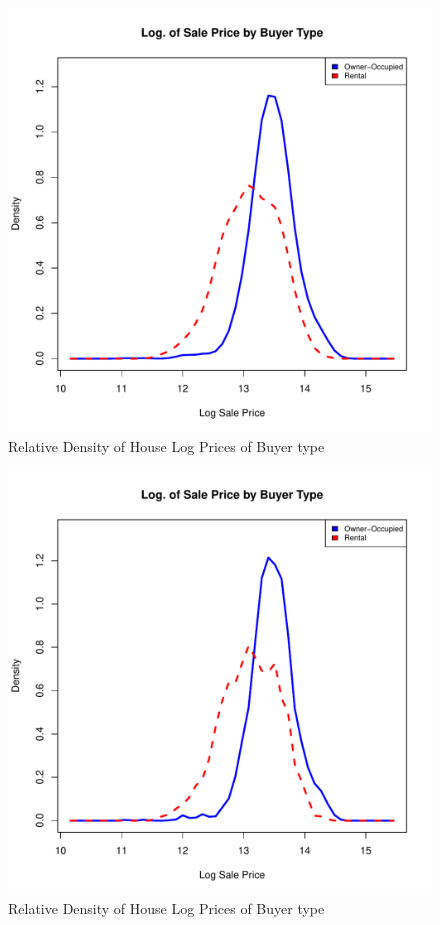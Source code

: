 %
%
\begin{figure}[h!]
  \centering
  \includegraphics[scale = 0.5, keepaspectratio=true]{../Figures/log_dens_by_owner}
  \caption{Relative Density of House Log Prices of Buyer type} \label{fig:log_dens_by_owner}
\end{figure}
%
%

\bigskip
\clearpage


\begin{figure}[h!]
  \centering
  \includegraphics[scale = 0.5, keepaspectratio=true]{../Figures/log_dens_by_owner_bw}
  \caption{Relative Density of House Log Prices of Buyer type} \label{fig:log_dens_by_owner_bw}
\end{figure}


